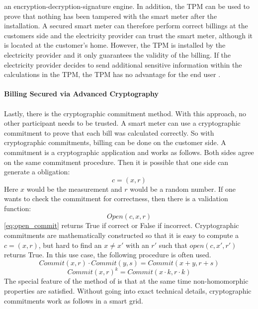 an encryption-decryption-signature engine. In addition, the TPM can be used to prove that nothing has been tampered with the smart meter after the installation. A secured smart meter can therefore perform correct billings at the customers side and the electricity provider can trust the smart meter, although it is located at the customer's home. However, the TPM is installed by the electricity provider and it only guarantees the validity of the billing. If the electricity provider decides to send additional sensitive information within the calculations in the TPM, the TPM has no advantage for the end user \cite{finster2014privacy}.\\
\\
\textbf{Billing Secured via Advanced Cryptography}
\\
\\
Lastly, there is the cryptographic commitment method.
With this approach, no other participant needs to be trusted. A smart meter can use a cryptographic commitment to prove that each bill was calculated correctly. So with cryptographic commitments, billing can be done on the customer side. A commitment is a cryptographic application and works as follows. Both sides agree on the same commitment procedure. Then it is possible that one side can generate a obligation:\begin{equation}
\label{eq:commitment}
c=(x,r)
\end{equation} 
Here $x$ would be the measurement and $r$ would be a random number. If one wants to check the commitment for correctness, then there is a validation function:
\begin{equation}
\label{eq:open_commit}
Open(c,x,r)
\end{equation} 
\ref{eq:open_commit} returns True if correct or False if incorrect.
Cryptographic commitments are mathematically constructed so that it is easy to compute a $c=(x,r)$, but hard to find an $x \neq x'$ with an $r'$ such that $open(c,x',r')$ returns True. In this use case, the following procedure is often used.\\
\begin{equation}
\label{eq:homomorph1}
Commit(x, r) \cdot Commit(y, s) = Commit(x+y, r+s)
\end{equation} 
\begin{equation}
\label{eq:homomorph2}
Commit(x, r)^{k} = Commit(x \cdot k, r \cdot k)
\end{equation} 
The special feature of the method of \cite{pedersen1991non} is that at the same time non-homomorphic properties are satisfied. Without going into exact technical details, cryptographic commitments work as follows in a smart grid.\\
